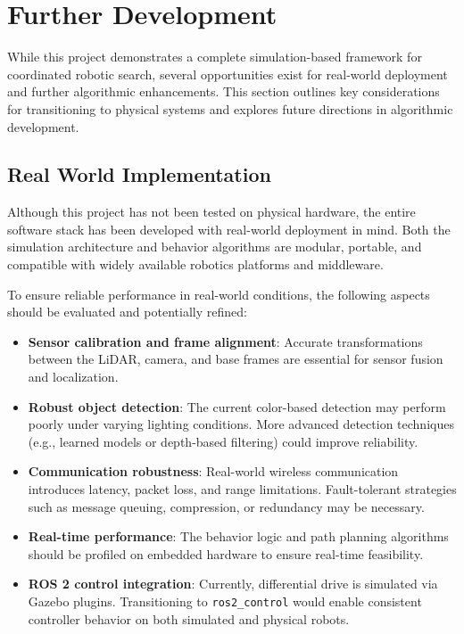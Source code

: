\section{Further Development}

While this project demonstrates a complete simulation-based framework for coordinated robotic search, several opportunities exist for real-world deployment and further algorithmic enhancements. This section outlines key considerations for transitioning to physical systems and explores future directions in algorithmic development.

\subsection{Real World Implementation}
Although this project has not been tested on physical hardware, the entire software stack has been developed with real-world deployment in mind. Both the simulation architecture and behavior algorithms are modular, portable, and compatible with widely available robotics platforms and middleware.

To ensure reliable performance in real-world conditions, the following aspects should be evaluated and potentially refined:

\begin{itemize}
  \item \textbf{Sensor calibration and frame alignment}: Accurate transformations between the LiDAR, camera, and base frames are essential for sensor fusion and localization.
  \item \textbf{Robust object detection}: The current color-based detection may perform poorly under varying lighting conditions. More advanced detection techniques (e.g., learned models or depth-based filtering) could improve reliability.
  \item \textbf{Communication robustness}: Real-world wireless communication introduces latency, packet loss, and range limitations. Fault-tolerant strategies such as message queuing, compression, or redundancy may be necessary.
  \item \textbf{Real-time performance}: The behavior logic and path planning algorithms should be profiled on embedded hardware to ensure real-time feasibility.
  \item \textbf{ROS 2 control integration}: Currently, differential drive is simulated via Gazebo plugins. Transitioning to \texttt{ros2\_control} would enable consistent controller behavior on both simulated and physical robots.
\end{itemize}


